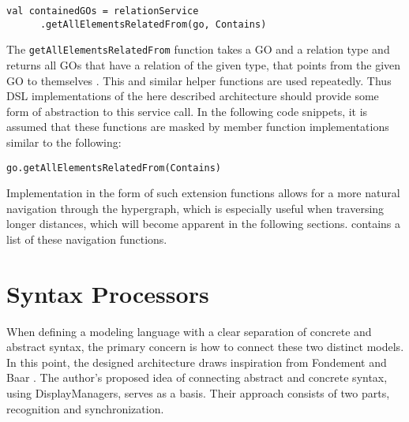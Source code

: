 \begin{lstlisting}[language=customLang, caption={Example of how to get all \texttt{GOs} contained by a given element \texttt{go} in the \textsc{CouchEdit} architecture}, captionpos=b]
val containedGOs = relationService
      .getAllElementsRelatedFrom(go, Contains) 
\end{lstlisting}

The \texttt{getAllElementsRelatedFrom} function takes a GO and a relation type and returns all GOs that have a relation of the given type, that points from the given  GO to themselves . This and similar helper functions are used repeatedly. Thus DSL implementations of the here described architecture should provide some form of abstraction to this service call. In the following code snippets, it is assumed that these functions are masked by member function implementations similar to the following:

\begin{lstlisting}[caption={The \texttt{getAllElementsRelatedFrom} function, implemented as a member function, eases navigation through the hypergraph}, captionpos=b]
go.getAllElementsRelatedFrom(Contains)
\end{lstlisting}

Implementation in the form of such extension functions allows for a more natural navigation through the hypergraph, which is especially useful when traversing longer distances, which will become apparent in the following sections.  contains a list of these navigation functions.


\section{Syntax Processors}
When defining a modeling language with a clear separation of concrete and abstract syntax, the primary concern is how to connect these two distinct models. In this point, the designed architecture draws inspiration from Fondement and Baar \cite{fondement_making_2005}. The author's proposed idea of connecting abstract and concrete syntax, using DisplayManagers, serves as a basis. Their approach consists of two parts, recognition and synchronization.

